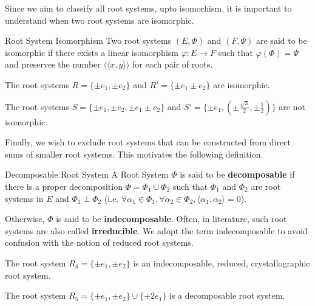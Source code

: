 Since we aim to classify all root systems, upto isomorhism, it is important to understand when two root systems are
isomorphic. \newline

\begin{nameddefinition}{Root System Isomorphism}
    Two root systems $(E, \Phi)$ and $(F,\Psi)$ are said to be isomorphic if there exists a linear isomorphism
    $\varphi: E \to F$ such that $\varphi(\Phi) = \Psi$
    and preserves the number $\langle \langle x, y \rangle \rangle$ for each pair of roots.
\end{nameddefinition}

\begin{example}
    The root systems $R = \{ \pm e_1, \pm e_2 \} $ and $R' = \{ \pm e_1 \pm e_2 \}$ are isomorphic.
\end{example}

\begin{example}
    The root systems
    $S = \{ \pm e_1, \pm e_2, \pm e_1 \pm e_2 \} $ and
    $S' = \{ \pm e_1, (\pm \frac{\sqrt{3}}{2}, \pm \frac{1}{2}) \}$ are not isomorphic.
\end{example}

Finally, we wish to exclude root systems that can be constructed from direct sums of smaller root systems.
This motivates the following definition. \newline

\begin{nameddefinition}{Decomposable Root System}
    A Root System $\Phi$ is said to be \textbf{decomposable} if there is a proper decomposition
    $\Phi = \Phi_1 \cup \Phi_2$ such that $\Phi_1$ and $\Phi_2$ are root systems in $E$ and $\Phi_1 \perp \Phi_2$ (i.e. 
    $\forall \alpha_1 \in \Phi_1 , \forall \alpha_2 \in \Phi_2,  \langle \alpha_1, \alpha_2 \rangle = 0$). \newline 

    Otherwise, $\Phi$ is said to be \textbf{indecomposable}. 
    Often, in literature, such root systems are also called \textbf{irreducible}.
    We adopt the term indecomposable to avoid confusion with the notion of reduced root systems.
\end{nameddefinition}

\begin{example}
    The root system $R_4 = \{ \pm e_1, \pm e_2 \}$ is an indecomposable, reduced, crystallographic root system.
\end{example}

\begin{example}
    The root system $R_5 = \{ \pm e_1, \pm e_2 \} \cup \{ \pm 2 e_1 \}$ is a decomposable root system.
\end{example}

